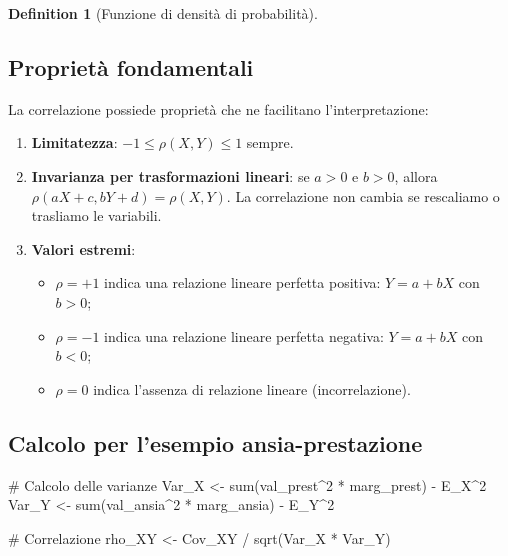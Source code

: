 \documentclass[
  letterpaper,
  DIV=11,
  numbers=noendperiod,
  oneside]{scrreprt}
\newenvironment{Shaded}{\begin{snugshade}}{\end{snugshade}}
\newcommand{\CommentTok}[1]{\textcolor[rgb]{0.37,0.37,0.37}{#1}}
\newcommand{\DecValTok}[1]{\textcolor[rgb]{0.68,0.00,0.00}{#1}}
\newcommand{\FunctionTok}[1]{\textcolor[rgb]{0.28,0.35,0.67}{#1}}
\newcommand{\NormalTok}[1]{\textcolor[rgb]{0.00,0.23,0.31}{#1}}
\newcommand{\OtherTok}[1]{\textcolor[rgb]{0.00,0.23,0.31}{#1}}
\newcommand{\SpecialCharTok}[1]{\textcolor[rgb]{0.37,0.37,0.37}{#1}}
\providecommand{\tightlist}{%
  \setlength{\itemsep}{0pt}\setlength{\parskip}{0pt}}
\theoremstyle{definition}
\theoremstyle{plain}
\theoremstyle{definition}
\newtheorem{definition}{Definition}[chapter]
\theoremstyle{remark}
\begin{document}
\begin{definition}[Funzione di densità di
probabilità]
\subsection{Proprietà fondamentali}\label{proprietuxe0-fondamentali-1}

La correlazione possiede proprietà che ne facilitano l'interpretazione:

\begin{enumerate}
\def\labelenumi{\arabic{enumi}.}
\item
  \textbf{Limitatezza}: \(-1 \leq \rho(X,Y) \leq 1\) sempre.
\item
  \textbf{Invarianza per trasformazioni lineari}: se \(a > 0\) e
  \(b > 0\), allora \(\rho(aX + c, bY + d) = \rho(X, Y)\). La
  correlazione non cambia se rescaliamo o trasliamo le variabili.
\item
  \textbf{Valori estremi}:

  \begin{itemize}
  \tightlist
  \item
    \(\rho = +1\) indica una relazione lineare perfetta positiva:
    \(Y = a + bX\) con \(b > 0\);
  \item
    \(\rho = -1\) indica una relazione lineare perfetta negativa:
    \(Y = a + bX\) con \(b < 0\);
  \item
    \(\rho = 0\) indica l'assenza di relazione lineare (incorrelazione).
  \end{itemize}
\end{enumerate}

\subsection{Calcolo per l'esempio
ansia-prestazione}\label{calcolo-per-lesempio-ansia-prestazione}

\begin{Shaded}
\begin{Highlighting}[]
\CommentTok{\# Calcolo delle varianze}
\NormalTok{Var\_X }\OtherTok{\textless{}{-}} \FunctionTok{sum}\NormalTok{(val\_prest}\SpecialCharTok{\^{}}\DecValTok{2} \SpecialCharTok{*}\NormalTok{ marg\_prest) }\SpecialCharTok{{-}}\NormalTok{ E\_X}\SpecialCharTok{\^{}}\DecValTok{2}
\NormalTok{Var\_Y }\OtherTok{\textless{}{-}} \FunctionTok{sum}\NormalTok{(val\_ansia}\SpecialCharTok{\^{}}\DecValTok{2} \SpecialCharTok{*}\NormalTok{ marg\_ansia) }\SpecialCharTok{{-}}\NormalTok{ E\_Y}\SpecialCharTok{\^{}}\DecValTok{2}

\CommentTok{\# Correlazione}
\NormalTok{rho\_XY }\OtherTok{\textless{}{-}}\NormalTok{ Cov\_XY }\SpecialCharTok{/} \FunctionTok{sqrt}\NormalTok{(Var\_X }\SpecialCharTok{*}\NormalTok{ Var\_Y)}


\end{Highlighting}
\end{Shaded}
\end{definition}
\end{document}
